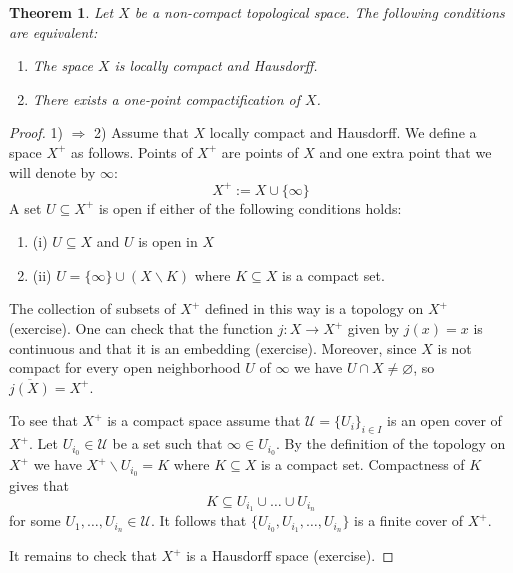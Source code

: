 \documentclass[11pt, letterpaper, oneside]{report}
\theoremstyle{pplain}
\newtheorem{theorem}{Theorem}[chapter]
\newtheorem{ITERMVALUE THM}[theorem]{Intermediate Value Theorem}
\newtheorem{HEINEBOREL THM}[theorem]{Heine-Borel Theorem}
\newtheorem{UMETR THM}[theorem]{Urysohn Metrization Theorem}
\newtheorem{UMETR2 THM}[theorem]{Urysohn Metrization Theorem (v.2)}
\theoremstyle{ddefinition}
\theoremstyle{nnn}
\newtheorem{TDA NN}[theorem]{Topological Data Analysis. }
\theoremstyle{eexercise}
\newcommand{\Ra}{\Rightarrow}
\newcommand{\UU}{{\mathcal U}}
\newcommand{\ssmin}{\smallsetminus}
\newcommand{\benu}{\begin{enumerate}}
\newcommand{\eenu}{\end{enumerate}}
\begin{document}
\begin{theorem}
\label{ONE POINT COMPACT THM}
Let $X$ be a non-compact topological  space. The following conditions are equivalent:
\benu
\item The space $X$ is locally compact and Hausdorff.
\item There exists a one-point compactification of $X$.
\eenu
\end{theorem}

\begin{proof}
1) $\Ra$ 2) Assume that $X$ locally compact and Hausdorff. We  define a space $X^{+}$ as follows. 
 Points of $X^{+}$ are  points of $X$ and one extra point that we will denote by $\infty$:
$$X^{+}:= X\cup \{\infty\}$$
A set $U\subseteq X^{+}$ is open if either of the following conditions holds:
\benu
\item[(i)] $U\subseteq X$ and $U$ is open in $X$
\item[(ii)] $U = \{\infty\}\cup (X\ssmin K)$ where $K\subseteq X$ is a compact set. 
\eenu
The collection of subsets of $X^{+}$ defined in this way is a topology on $X^{+}$ (exercise).
One can check that the function $j\colon X \to X^{+}$ given by $j(x) = x$ is continuous 
and that it is an embedding (exercise).  Moreover, since $X$ is not compact for every open 
neighborhood $U$ of $\infty$ we have $U\cap X \neq \varnothing$, so $\overline{j(X)} = X^{+}$.

To see that $X^{+}$ is a compact space assume that $\UU = \{U_{i}\}_{i\in I}$ is an open cover 
of $X^{+}$. Let $U_{i_{0}}\in \UU$ be a set such that $\infty \in U_{i_{0}}$. By the definition 
of the topology on $X^{+}$ we have $X^{+}\ssmin U_{i_{0}} = K$ where $K\subseteq X$ is a 
compact set. Compactness of $K$ gives that 
$$K\subseteq U_{i_{1}}\cup \dots \cup U_{i_{n}}$$
for some $U_{1}, \dots, U_{i_{n}}\in \UU$. 
It follows that  $\{U_{i_{0}}, U_{i_{1}}, \dots, U_{i_{n}}\}$ is a finite cover of $X^{+}$. 

It remains to check that  $X^{+}$ is a Hausdorff space (exercise). 

%  




\end{proof}
\end{document}
